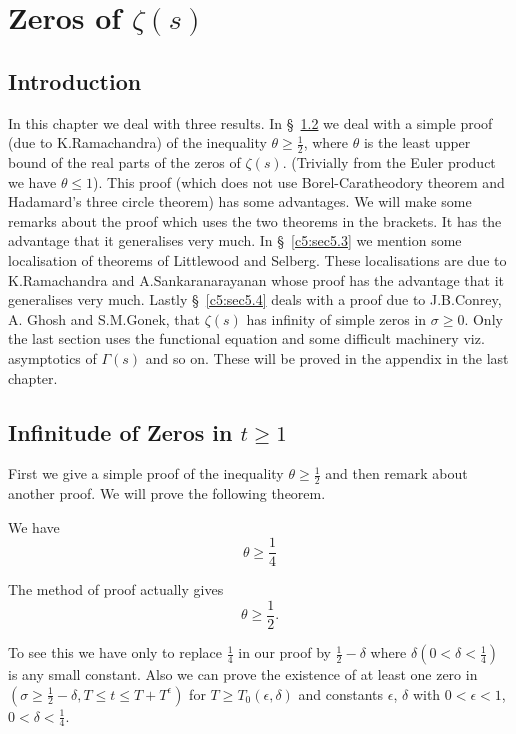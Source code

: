 
\chapter{Zeros of $\zeta(s)$}\label{c5}

\section{Introduction}\label{c5:sec5.1}\pageoriginale 

In this chapter we deal with three results. 
In \S\ \ref{c5:sec5.2} we deal with a
simple proof (due to K.\@ Ramachandra) of the inequality $\theta\geq
\frac{1}{2}$, where $\theta$ is the least upper bound of the real
parts of the zeros of $\zeta(s)$. (Trivially from the Euler product we
have $\theta\leq 1$). This proof (which does not use
Borel-Caratheodory theorem and Hadamard's three circle theorem) has
some advantages. We will make some remarks about the proof which uses
the two theorems in the brackets. It has the advantage that it
generalises very much. In \S\ \ref{c5:sec5.3} we mention some
localisation of theorems of Littlewood and Selberg. These
localisations are due to K.\@ Ramachandra and A.\@ Sankaranarayanan
whose proof has the advantage that it generalises very much. Lastly
\S\ \ref{c5:sec5.4} deals with a proof due to J.B.\@ Conrey, A.\@
Ghosh and S.M.\@ Gonek, that $\zeta(s)$ has infinity of simple zeros
in $\sigma\geq 0$. Only the last section uses the functional equation
and some difficult machinery viz. asymptotics of $\Gamma(s)$ and so
on. These will be proved in the appendix in the last chapter.

\section{Infinitude of Zeros in $t\geq 1$}\label{c5:sec5.2}

First we give a simple proof of the inequality $\theta\geq
\frac{1}{2}$ and then remark about another proof. We will prove the
following theorem.

\begin{theorem}\label{c5:thm5.2.1}
We have
\begin{equation*}
\theta\geq \frac{1}{4}\tag{5.2.1}\label{c5:eq5.2.1}
\end{equation*}
\end{theorem}

\setcounter{remark}{0}
\begin{remark}\label{c5:rem1}
The method of proof actually gives
\begin{equation*}
\theta\geq \frac{1}{2}.\tag{5.2.2}\label{c5:eq5.2.2}
\end{equation*}

To see this we have only to replace $\frac{1}{4}$ in our proof by
$\frac{1}{2}-\delta$ where $\delta(0<\delta<\frac{1}{4})$ is any small
constant. Also we can prove the existence of at least one zero in
$(\sigma\geq \frac{1}{2}-\delta,T\leq t\leq T+T^{\epsilon})$ for
$T\geq T_{0}(\epsilon,\delta)$ and constants $\epsilon$, $\delta$ with
$0<\epsilon<1$, $0<\delta<\frac{1}{4}$.
\end{remark}

